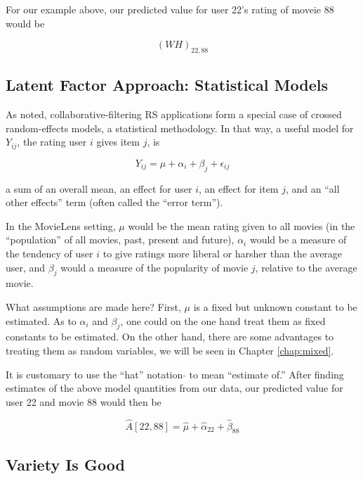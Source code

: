 For our example above, our predicted value for user 22's rating of
moveie 88 would be

\begin{equation}
(WH)_{22,88}
\end{equation}

\subsection{Latent Factor Approach: Statistical Models}

As noted, collaborative-filtering RS applications form a special case of
crossed random-effects models, a statistical methodology.  In that way,
a useful model for $Y_{ij}$, the rating user $i$ gives item $j$, is

\begin{equation}
Y_{ij} = \mu + \alpha_i + \beta_j + \epsilon_{ij}
\end{equation}

a sum of an overall mean, an effect for user $i$, an effect for item
$j$, and an ``all other effects'' term (often called the ``error
term'').

In the MovieLens setting, $\mu$ would be the mean rating given to all
movies (in the ``population'' of all movies, past, present and future),
$\alpha_i$ would be a measure of the tendency of user $i$ to give
ratings more liberal or harsher than the average user, and $\beta_j$
would a measure of the popularity of movie $j$, relative to the average
movie.

What assumptions are made here?  First, $\mu$ is a fixed but unknown
constant to be estimated.  As to $\alpha_i$ and $\beta_j$, one could on
the one hand treat them as fixed constants to be estimated.  On the
other hand, there are some advantages to treating them as random
variables, we will be seen in Chapter \ref{chap:mixed}.

It is customary to use the ``hat'' notation $\widehat{}$ to mean
``estimate of.''  After finding estimates of the above model quantities
from our data, our predicted value for user 22 and movie 88 would then
be

\begin{equation}
\widehat{A}[22,88] = \widehat{\mu} + \widehat{\alpha}_{22} + 
\widehat{\beta}_{88}
\end{equation}

\subsection{Variety Is Good}

